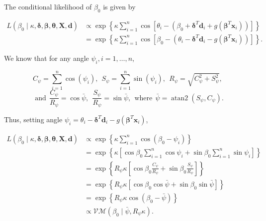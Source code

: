 \documentclass[11pt,a4paper]{article}\usepackage[]{graphicx}\usepackage[]{color}
\DeclareMathOperator{\atantwo}{atan2}
\newcommand{\bX}{\boldsymbol{X}}
\newcommand{\bt}{\boldsymbol{\theta}}
\newcommand{\bd}{\boldsymbol{d}}
\newcommand{\bdt}{\boldsymbol{\delta}}
\newcommand{\bbt}{\boldsymbol{\beta}}
\begin{document}
The conditional likelihood of $\beta_0$ is given by

\begin{align*}
L(\beta_0 \mid \kappa, \bdt, \bbt, \bt, \bX, \bd) & \propto \exp \left\lbrace \kappa \sum_{i=1}^n \cos \left[ \theta_i - (\beta_0 + \bdt^T \bd_i +  g(\boldsymbol\beta^T \boldsymbol{x}_i)) \right] \right\rbrace \\
& = \exp \left\lbrace \kappa \sum_{i=1}^n \cos \left[ \beta_0 - (\theta_i - \bdt^T \bd_i - g(\boldsymbol\beta^T \boldsymbol{x}_i)) \right]  \right\rbrace.
\end{align*}

We know that for any angle $\psi_i, i = 1, \dots, n$,

\begin{equation*}
 C_{\psi} = \sum_{i=1}^n \cos(\psi_i), ~~ S_{\psi} = \sum_{i=1}^n \sin(\psi_i), ~~ R_{\psi} = \sqrt{C_{\psi}^2 + S_{\psi}^2}, ~~
\end{equation*}
\begin{equation*}
 \text{and} ~~ \frac{C_{\psi}}{R_{\psi}} = \cos \bar\psi, ~~ \frac{S_{\psi}}{R_{\psi}} = \sin \bar\psi, ~~ \text{where} ~~ \bar\psi = \atantwo(S_{\psi}, C_{\psi}).
\end{equation*}

Thus, setting angle $\psi_i = \theta_i - \bdt^T \bd_i - g(\boldsymbol\beta^T \boldsymbol{x}_i)$,


\begin{align*}
L(\beta_0 \mid \kappa, \bdt, \bbt, \bt, \bX, \bd) & \propto \exp \left\lbrace \kappa \sum_{i=1}^n \cos ( \beta_0 - \psi_i)  \right\rbrace \\
& = \exp \left\lbrace \kappa   \left[ \cos\beta_0 \sum_{i=1}^n \cos\psi_i +  \sin\beta_0 \sum_{i=1}^n \sin\psi_i \right]  \right\rbrace \\
& = \exp \left\lbrace R_{\psi}  \kappa  \left[ \cos\beta_0 \frac{C_{\psi}}{R_{\psi}} +  \sin\beta_0 \frac{S_{\psi}}{R_{\psi}} \right]  \right\rbrace \\
& = \exp \left\lbrace R_{\psi} \kappa   \left[ \cos\beta_0 \cos{\bar\psi} +  \sin\beta_0 \sin{\bar\psi}\right]  \right\rbrace \\
& = \exp \left\lbrace R_{\psi} \kappa \cos \left( \beta_0 - \bar\psi \right)  \right\rbrace \\
& \propto \mathcal{VM}(\beta_0 \mid \bar\psi, R_{\psi} \kappa).
\end{align*}








\end{document}
